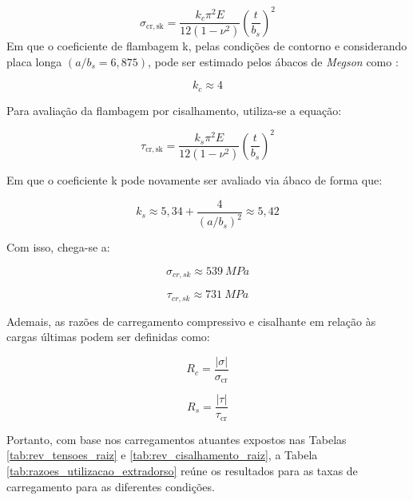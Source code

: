 \begin{equation}
    \sigma_{\mathrm{cr,sk}} =
\frac{k_c \pi^2 E}{12(1-\nu^2)}
\left(\frac{t}{b_s}\right)^2
\end{equation}
Em que o coeficiente de flambagem k, pelas condições de contorno e considerando placa longa $(a/b_s = 6,875)$, pode ser estimado pelos ábacos de \textit{Megson}  como \cite{megson2007}: 

\begin{equation}
    k_c \approx 4
\end{equation}


Para avaliação da flambagem por cisalhamento, utiliza-se a equação:

\begin{equation}
    \tau_{\mathrm{cr,sk}} =
\frac{k_s \pi^2 E}{12(1-\nu^2)}
\left(\frac{t}{b_s}\right)^2
\end{equation}

Em que o coeficiente k pode novamente ser avaliado via ábaco de forma que:

\begin{equation}
    k_s \approx 5{,}34 + \frac{4}{(a/b_s)^2}\approx 5,42
\end{equation}

Com isso, chega-se a:

\begin{equation}
    \sigma_{cr,sk}\approx 539 \ MPa
\end{equation}

\begin{equation}
    \tau_{cr,sk}\approx 731 \ MPa
\end{equation}


Ademais, as razões de carregamento compressivo e cisalhante em relação às cargas últimas podem ser definidas como:

\begin{equation}
    R_c = \frac{|\sigma|}{\sigma_{\mathrm{cr}}}
\end{equation}

\begin{equation}
    R_s = \frac{|\tau|}{\tau_{\mathrm{cr}}}
\end{equation}

Portanto, com base nos carregamentos atuantes expostos nas Tabelas \ref{tab:rev_tensoes_raiz} e \ref{tab:rev_cisalhamento_raiz}, a Tabela \ref{tab:razoes_utilizacao_extradorso} reúne os resultados para as taxas de carregamento para as diferentes condições.

